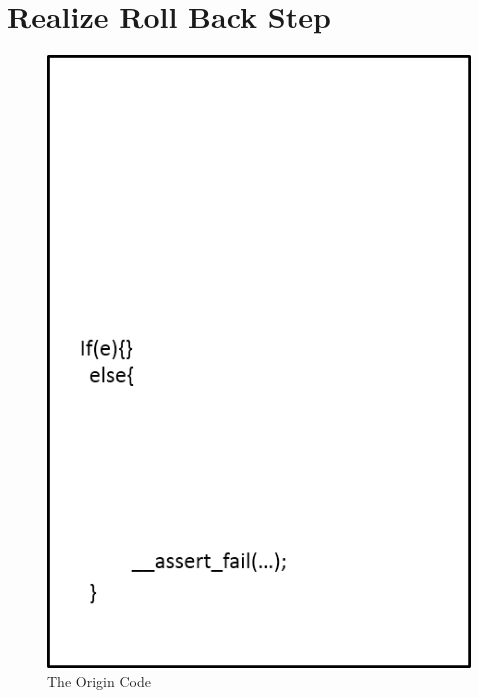 \section{Realize Roll Back Step}
\begin{figure}
\begin{minipage}[t]{0.5\linewidth}
\centering
\includegraphics[width=\textwidth]{body/rollback_1.png}
\caption{The Origin Code}
\label {OC}
\end{minipage}%
\begin{minipage}[t]{0.5\linewidth}
\centering

\end{minipage}
\end{figure}
